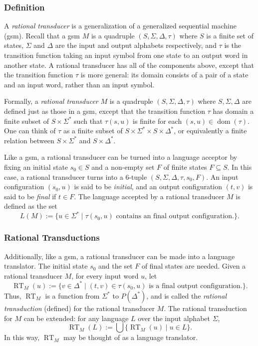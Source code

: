 \documentclass[12pt]{article}
\begin{document}
\subsubsection*{Definition}

A \emph{rational transducer} is a generalization of a generalized sequential machine (gsm).  Recall that a gsm $M$ is a quadruple $(S,\Sigma,\Delta,\tau)$ where $S$ is a finite set of states, $\Sigma$ and $\Delta$ are the input and output alphabets respectively, and $\tau$ is the transition function taking an input symbol from one state to an output word in another state.  A rational transducer has all of the components above, except that the transition function $\tau$ is more general: its domain consists of a pair of a state and an input word, rather than an input symbol.  

Formally, a \emph{rational transducer} $M$ is a quadruple $(S,\Sigma,\Delta,\tau)$ where $S,\Sigma,\Delta$ are defined just as those in a gsm, except that the transition function $\tau$ has domain a finite subset of $S\times \Sigma^*$ such that $\tau(s,u)$ is finite for each $(s,u)\in \operatorname{dom}(\tau)$.  One can think of $\tau$ as a finite subset of $S\times \Sigma^* \times S\times \Delta^*$, or equivalently a finite relation between $S\times \Sigma^*$ and $S\times \Delta^*$.

Like a gsm, a rational transducer can be turned into a language acceptor by fixing an initial state $s_0 \in S$ and a non-empty set $F$ of finite states $F\subseteq S$.  In this case, a rational transducer turns into a 6-tuple $(S,\Sigma,\Delta,\tau, s_0,F)$.  An input configuration $(s_0,u)$ is said to be \emph{initial}, and an output configuration $(t,v)$ is said to be \emph{final} if $t\in F$.  The language accepted by a rational transducer $M$ is defined as the set $$L(M):=\lbrace u\in \Sigma^* \mid \tau(s_0,u) \mbox{ contains an final output configuration.}\rbrace.$$

\subsubsection*{Rational Transductions}

Additionally, like a gsm, a rational transducer can be made into a language translator.  The initial state $s_0$ and the set $F$ of final states are needed.  Given a rational transducer $M$, for every input word $u$, let $$\operatorname{RT}_M(u):=\lbrace v \in \Delta^* \mid (t,v)\in \tau(s_0,u) \mbox{ is a final output configuration.}\rbrace.$$
Thus, $\operatorname{RT}_M$ is a function from $\Sigma^*$ to $P(\Delta^*)$, and is called the \emph{rational transduction} (defined) for the rational transducer $M$.  The rational transduction for $M$ can be extended: for any language $L$ over the input alphabet $\Sigma$,
$$\operatorname{RT}_M(L):=\bigcup \lbrace \operatorname{RT}_M(u)\mid u\in L\rbrace.$$
In this way, $\operatorname{RT}_M$ may be thought of as a language translator.
\end{document}
